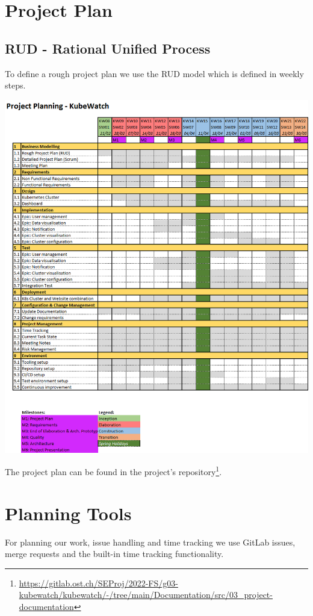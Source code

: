 \section{Project Plan}
\subsection{RUD - Rational Unified Process}
To define a rough project plan we use the RUD model which is defined in weekly steps. \newline

    \includegraphics[width=\textwidth]{resources/project-plan-RUD.png}

The project plan can be found in the project's repository\footnote{\url{https://gitlab.ost.ch/SEProj/2022-FS/g03-kubewatch/kubewatch/-/tree/main/Documentation/src/03_project-documentation}}.

\section{Planning Tools}
For planning our work, issue handling and time tracking we use GitLab issues, merge requests and the built-in time tracking functionality.

